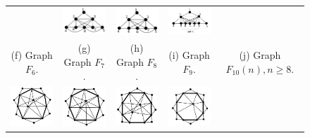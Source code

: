 \begin{figure}[htb]
\begin{tabular}{  c c c c  c}
    & 
    \includegraphics[width=3cm]{img/f8.png} 
    & 
    \includegraphics[width=3cm]{img/f9.png} 
    & 
    \includegraphics[width=3cm]{img/f10n2.png} 
    \\ %
    \footnotesize 
    (f)  \footnotesize Graph $F_6$. 
    & 
    \footnotesize (g) Graph $F_7$.
    & 
    \footnotesize (h) Graph $F_8$.
    & 
    \footnotesize (i) Graph $F_9$.
    & 
    \footnotesize (j) Graph $F_{10}(n), n\geq  8$.
    \\%
        \includegraphics[width=3cm]{img/f11.png} 
    & 
    \includegraphics[width=3cm]{img/f12.png} 
    & 
    \includegraphics[width=3cm]{img/f13.png} 
    & 
    \includegraphics[width=3cm]{img/f14.png} 

\end{tabular}
\end{figure}
